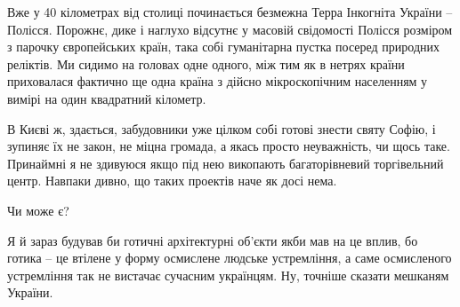Вже у 40 кілометрах від столиці починається безмежна Терра Інкогніта України –
Полісся. Порожнє, дике і наглухо відсутнє у масовій свідомості Полісся розміром
з парочку європейських країн, така собі гуманітарна пустка посеред природних
реліктів. Ми сидимо на головах одне одного, між тим як в нетрях країни
приховалася фактично ще одна країна з дійсно мікроскопічним населенням у вимірі
на один квадратний кілометр.

В Києві ж, здається, забудовники уже цілком собі готові знести святу Софію, і зупиняє їх не закон, не міцна громада, а якась просто неуважність, чи щось таке. Принаймні я не здивуюся якщо під нею викопають багаторівневий торгівельний центр. Навпаки дивно, що таких проектів наче як досі нема.

Чи може є? 

Я й зараз будував би готичні архітектурні об'єкти якби мав на це вплив, бо готика – це втілене у форму осмислене людське устремління, а саме осмисленого устремління так не вистачає сучасним українцям. Ну, точніше сказати мешканям України.
